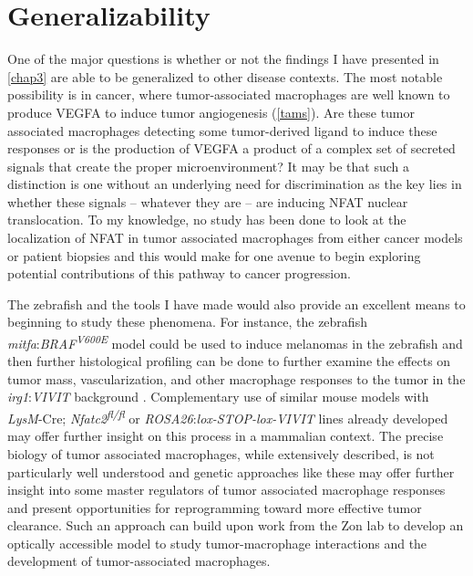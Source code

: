 \section{Generalizability}\label{generalizability}

One of the major questions is whether or not the findings I have presented in \autoref{chap3} are able to be generalized to other disease contexts. The most notable possibility is in cancer, where tumor\hyp{}associated macrophages are well known to produce VEGFA to induce tumor angiogenesis (\autoref{tams}). Are these tumor associated macrophages detecting some tumor\hyp{}derived ligand to induce these responses or is the production of VEGFA a product of a complex set of secreted signals that create the proper microenvironment? It may be that such a distinction is one without an underlying need for discrimination as the key lies in whether these signals -- whatever they are -- are inducing NFAT nuclear translocation. To my knowledge, no study has been done to look at the localization of NFAT in tumor associated macrophages from either cancer models or patient biopsies and this would make for one avenue to begin exploring potential contributions of this pathway to cancer progression. 

The zebrafish and the tools I have made would also provide an excellent means to beginning to study these phenomena. For instance, the zebrafish \textit{mitfa}:\textit{BRAF\textsuperscript{V600E}} model could be used to induce melanomas in the zebrafish and then further histological profiling can be done to further examine the effects on tumor mass, vascularization, and other macrophage responses to the tumor in the \textit{irg1}:\textit{VIVIT} background \citep{Patton2005, Brewer2022}. Complementary use of similar mouse models with \textit{LysM}\hyp{}Cre; \textit{Nfatc2\textsuperscript{fl/fl}} or \textit{ROSA26}:\textit{lox\hyp{}STOP\hyp{}lox\hyp{}VIVIT} lines already developed may offer further insight on this process in a mammalian context. The precise biology of tumor associated macrophages, while extensively described, is not particularly well understood and genetic approaches like these may offer further insight into some master regulators of tumor associated macrophage responses and present opportunities for reprogramming toward more effective tumor clearance. Such an approach can build upon work from the Zon lab to develop an optically accessible model to study tumor-macrophage interactions and the development of tumor-associated macrophages.

